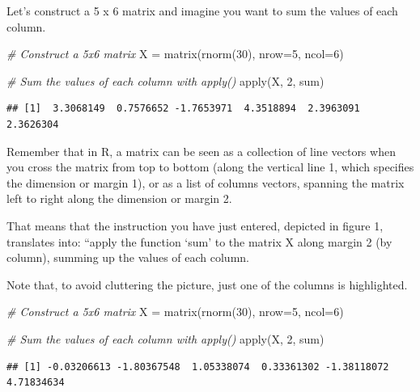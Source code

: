 \documentclass[
]{book}
\newenvironment{Shaded}{\begin{snugshade}}{\end{snugshade}}
\newcommand{\AttributeTok}[1]{\textcolor[rgb]{0.77,0.63,0.00}{#1}}
\newcommand{\CommentTok}[1]{\textcolor[rgb]{0.56,0.35,0.01}{\textit{#1}}}
\newcommand{\DecValTok}[1]{\textcolor[rgb]{0.00,0.00,0.81}{#1}}
\newcommand{\FunctionTok}[1]{\textcolor[rgb]{0.00,0.00,0.00}{#1}}
\newcommand{\NormalTok}[1]{#1}
\newcommand{\OtherTok}[1]{\textcolor[rgb]{0.56,0.35,0.01}{#1}}
\begin{document}
Let's construct a 5 x 6 matrix and imagine you want to sum the values of each column.

\begin{Shaded}
\begin{Highlighting}[]
\CommentTok{\# Construct a 5x6 matrix}
\NormalTok{X }\OtherTok{=} \FunctionTok{matrix}\NormalTok{(}\FunctionTok{rnorm}\NormalTok{(}\DecValTok{30}\NormalTok{), }\AttributeTok{nrow=}\DecValTok{5}\NormalTok{, }\AttributeTok{ncol=}\DecValTok{6}\NormalTok{)}

\CommentTok{\# Sum the values of each column with \textasciigrave{}apply()\textasciigrave{}}
\FunctionTok{apply}\NormalTok{(X, }\DecValTok{2}\NormalTok{, sum)}
\end{Highlighting}
\end{Shaded}

\begin{verbatim}
## [1]  3.3068149  0.7576652 -1.7653971  4.3518894  2.3963091  2.3626304
\end{verbatim}

Remember that in R, a matrix can be seen as a collection of line vectors when you cross the matrix from top to bottom (along the vertical line 1, which specifies the dimension or margin 1), or as a list of columns vectors, spanning the matrix left to right along the dimension or margin 2.

That means that the instruction you have just entered, depicted in figure 1, translates into: ``apply the function `sum' to the matrix X along margin 2 (by column), summing up the values of each column.

Note that, to avoid cluttering the picture, just one of the columns is highlighted.

\begin{Shaded}
\begin{Highlighting}[]
\CommentTok{\# Construct a 5x6 matrix}
\NormalTok{X }\OtherTok{=} \FunctionTok{matrix}\NormalTok{(}\FunctionTok{rnorm}\NormalTok{(}\DecValTok{30}\NormalTok{), }\AttributeTok{nrow=}\DecValTok{5}\NormalTok{, }\AttributeTok{ncol=}\DecValTok{6}\NormalTok{)}

\CommentTok{\# Sum the values of each column with \textasciigrave{}apply()\textasciigrave{}}
\FunctionTok{apply}\NormalTok{(X, }\DecValTok{2}\NormalTok{, sum)}
\end{Highlighting}
\end{Shaded}

\begin{verbatim}
## [1] -0.03206613 -1.80367548  1.05338074  0.33361302 -1.38118072  4.71834634
\end{verbatim}
\end{document}
